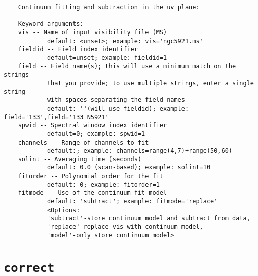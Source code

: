 \small
\begin{verbatim}
    Continuum fitting and subtraction in the uv plane:
    
    Keyword arguments:
    vis -- Name of input visibility file (MS)
            default: <unset>; example: vis='ngc5921.ms'
    fieldid -- Field index identifier
            default=unset; example: fieldid=1
    field -- Field name(s); this will use a minimum match on the strings
            that you provide; to use multiple strings, enter a single string
            with spaces separating the field names
            default: ''(will use fieldid); example: field='133',field='133 N5921'
    spwid -- Spectral window index identifier
            default=0; example: spwid=1
    channels -- Range of channels to fit
            default:; example: channels=range(4,7)+range(50,60)
    solint -- Averaging time (seconds)
            default: 0.0 (scan-based); example: solint=10
    fitorder -- Polynomial order for the fit
            default: 0; example: fitorder=1
    fitmode -- Use of the continuum fit model
            default: 'subtract'; example: fitmode='replace'
            <Options: 
            'subtract'-store continuum model and subtract from data,
            'replace'-replace vis with continuum model,
            'model'-only store continuum model>
\end{verbatim}
\normalsize


\section{{\tt correct}}
\label{section:tasks.correct}

